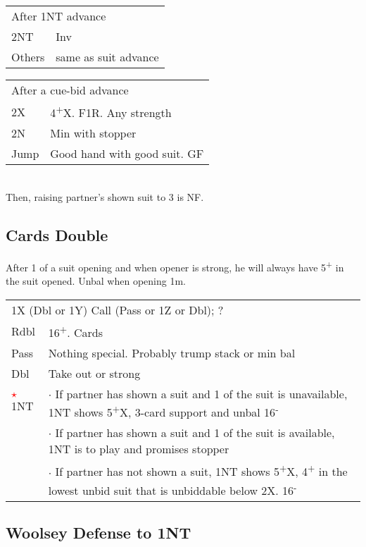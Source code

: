 \documentclass{article}
\newcommand{\nt}{\relsize{-1}NT\relsize{1}}
\newcommand{\up}{\textsuperscript{+}}
\newcommand{\down}{\textsuperscript{-}}
\newcommand{\al}{\textcolor{red}{$\star$}}
\begin{document}
\medskip

\begin{tabular}{|l|p{6.5cm}}
	\multicolumn{2}{l}{After 1\nt{} advance} \\
  2\nt{} & Inv \\
	Others & same as suit advance \\
\end{tabular}

\medskip

\begin{tabular}{|l|p{6.5cm}}
	\multicolumn{2}{l}{After a cue-bid advance} \\
  2X & 4\up{}X. F1R. Any strength \\
	2N & Min with stopper \\
	Jump & Good hand with good suit. GF \\
\end{tabular}\\
Then, raising partner's shown suit to 3 is NF.

\subsection{Cards Double}
After 1 of a suit opening and when opener is strong, he will always have 5\up{} in the suit opened. Unbal when opening 1m. \\

\begin{tabular}{|l|p{6.5cm}}
	\multicolumn{2}{l}{1X (Dbl or 1Y) Call (Pass or 1Z or Dbl); ?} \\
	Rdbl & 16\up{}. Cards \\
	Pass & Nothing special. Probably trump stack or min bal \\
	Dbl & Take out or strong \\
	\al{}1\nt{} &  $\cdot$ If partner has shown a suit and 1 of the suit is unavailable, 1\nt{} shows 5\up{}X, 3-card support and unbal 16\down{} \\
	 &  $\cdot$ If partner has shown a suit and 1 of the suit is available, 1\nt{} is to play and promises stopper \\
	 &  $\cdot$ If partner has not shown a suit, 1\nt{} shows 5\up{}X, 4\up{} in the lowest unbid suit that is unbiddable below 2X. 16\down{} \\
\end{tabular}

\subsection{Woolsey Defense to 1\nt{}}
\end{document}
